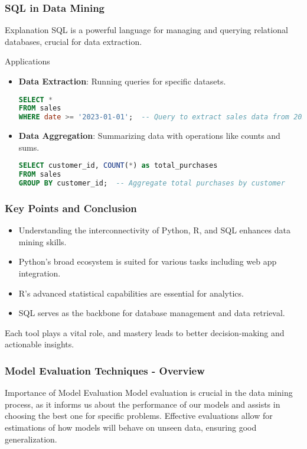 \documentclass[aspectratio=169]{beamer}
\begin{document}
\begin{frame}[fragile]
    \frametitle{SQL in Data Mining}
    \begin{block}{Explanation}
    SQL is a powerful language for managing and querying relational databases, crucial for data extraction.
    \end{block}
    
    \begin{block}{Applications}
        \begin{itemize}
            \item \textbf{Data Extraction}: Running queries for specific datasets.
            \begin{lstlisting}[language=SQL]
SELECT *
FROM sales
WHERE date >= '2023-01-01';  -- Query to extract sales data from 2023
            \end{lstlisting}
            
            \item \textbf{Data Aggregation}: Summarizing data with operations like counts and sums.
            \begin{lstlisting}[language=SQL]
SELECT customer_id, COUNT(*) as total_purchases
FROM sales
GROUP BY customer_id;  -- Aggregate total purchases by customer
            \end{lstlisting}
        \end{itemize}
    \end{block}
\end{frame}

\begin{frame}
    \frametitle{Key Points and Conclusion}
    \begin{itemize}
        \item Understanding the interconnectivity of Python, R, and SQL enhances data mining skills.
        \item Python’s broad ecosystem is suited for various tasks including web app integration.
        \item R’s advanced statistical capabilities are essential for analytics.
        \item SQL serves as the backbone for database management and data retrieval.
    \end{itemize}
    Each tool plays a vital role, and mastery leads to better decision-making and actionable insights.
\end{frame}

\begin{frame}[fragile]
    \frametitle{Model Evaluation Techniques - Overview}
    \begin{block}{Importance of Model Evaluation}
        Model evaluation is crucial in the data mining process, as it informs us about the performance of our models and assists in choosing the best one for specific problems. Effective evaluations allow for estimations of how models will behave on unseen data, ensuring good generalization.
    \end{block}
\end{frame}
\end{document}
